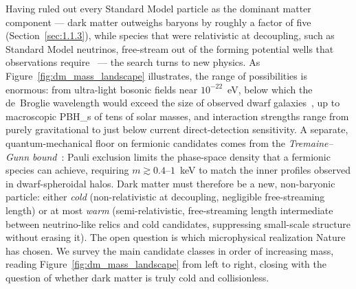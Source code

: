 Having ruled out every Standard Model particle as the dominant matter component --- dark matter outweighs baryons by roughly a factor of five (Section~\ref{sec:1.1.3}), while species that were relativistic at decoupling, such as Standard Model neutrinos, free-stream out of the forming potential wells that observations require~\cite{Bullock:2017xww} --- the search turns to new physics.
As Figure~\ref{fig:dm_mass_landscape} illustrates, the range of possibilities is enormous: 
from ultra-light bosonic fields near $10^{-22}$~eV, below which the de~Broglie wavelength would exceed the size of observed dwarf galaxies~\cite{Hu:2000ke}, up to macroscopic \glspl{PBH_} of tens of solar masses, and interaction strengths range from purely gravitational to just below current direct-detection sensitivity.
A separate, quantum-mechanical floor on fermionic candidates comes from the \emph{Tremaine--Gunn bound}~\cite{Tremaine:1979we,Boyarsky:2018tvu}: Pauli exclusion limits the phase-space density that a fermionic species can achieve, requiring $m \gtrsim 0.4$--$1$~keV to match the inner profiles observed in dwarf-spheroidal halos.
Dark matter must therefore be a new, non-baryonic particle: either \emph{cold} (non-relativistic at decoupling, negligible free-streaming length) or at most \emph{warm} (semi-relativistic, free-streaming length intermediate between neutrino-like relics and cold candidates, suppressing small-scale structure without erasing it).
The open question is which microphysical realization Nature has chosen.
We survey the main candidate classes in order of increasing mass, reading Figure~\ref{fig:dm_mass_landscape} from left to right, closing with the question of whether dark matter is truly cold and collisionless.

